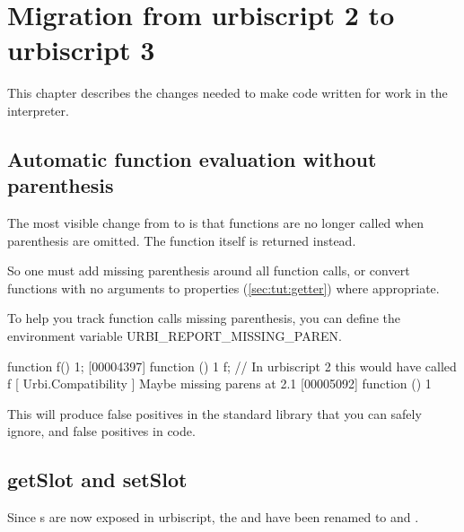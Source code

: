 
\chapter{Migration from urbiscript 2 to urbiscript 3}
\label{sec:guide:k2tok3}
This chapter describes the changes needed to make \us code written for
 work in the  interpreter.

\section{Automatic function evaluation without parenthesis}

The most visible change from  to  is that functions are no
longer called when parenthesis are omitted. The function itself is
returned instead.

So one must add missing parenthesis around all function calls, or convert
functions with no arguments to properties (\ref{sec:tut:getter}) where
appropriate.

To help you track function calls missing parenthesis, you can define
the environment variable URBI\_REPORT\_MISSING\_PAREN.

\begin{urbiunchecked}
function f() {1};
[00004397] function () { 1 }
f; // In urbiscript 2 this would have called f
[  Urbi.Compatibility   ] Maybe missing parens at 2.1
[00005092] function () { 1 }
\end{urbiunchecked}

This will produce false positives in the \us standard library that you can
safely ignore, and false positives in  code.

\section{getSlot and setSlot}

Since s are now exposed in urbiscript, the 
 and  have been renamed to
 and .
